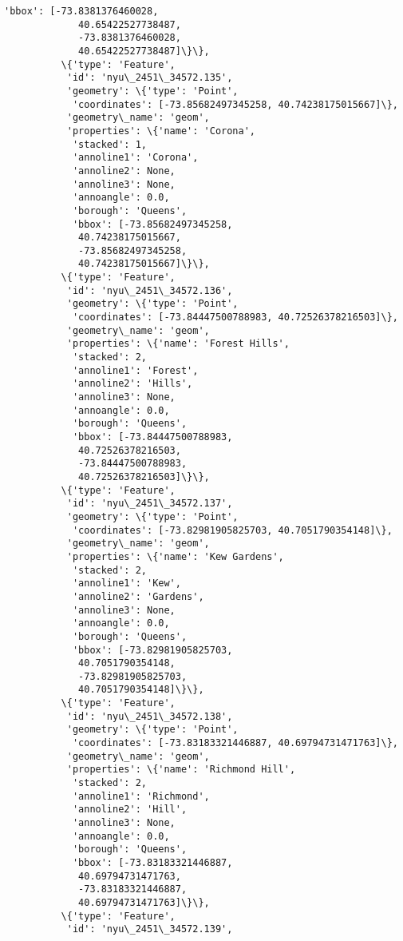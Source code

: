 \documentclass[11pt]{article}
\begin{document}
\begin{Verbatim}[commandchars=\\\{\}]
            'bbox': [-73.8381376460028,
             40.65422527738487,
             -73.8381376460028,
             40.65422527738487]\}\},
          \{'type': 'Feature',
           'id': 'nyu\_2451\_34572.135',
           'geometry': \{'type': 'Point',
            'coordinates': [-73.85682497345258, 40.74238175015667]\},
           'geometry\_name': 'geom',
           'properties': \{'name': 'Corona',
            'stacked': 1,
            'annoline1': 'Corona',
            'annoline2': None,
            'annoline3': None,
            'annoangle': 0.0,
            'borough': 'Queens',
            'bbox': [-73.85682497345258,
             40.74238175015667,
             -73.85682497345258,
             40.74238175015667]\}\},
          \{'type': 'Feature',
           'id': 'nyu\_2451\_34572.136',
           'geometry': \{'type': 'Point',
            'coordinates': [-73.84447500788983, 40.72526378216503]\},
           'geometry\_name': 'geom',
           'properties': \{'name': 'Forest Hills',
            'stacked': 2,
            'annoline1': 'Forest',
            'annoline2': 'Hills',
            'annoline3': None,
            'annoangle': 0.0,
            'borough': 'Queens',
            'bbox': [-73.84447500788983,
             40.72526378216503,
             -73.84447500788983,
             40.72526378216503]\}\},
          \{'type': 'Feature',
           'id': 'nyu\_2451\_34572.137',
           'geometry': \{'type': 'Point',
            'coordinates': [-73.82981905825703, 40.7051790354148]\},
           'geometry\_name': 'geom',
           'properties': \{'name': 'Kew Gardens',
            'stacked': 2,
            'annoline1': 'Kew',
            'annoline2': 'Gardens',
            'annoline3': None,
            'annoangle': 0.0,
            'borough': 'Queens',
            'bbox': [-73.82981905825703,
             40.7051790354148,
             -73.82981905825703,
             40.7051790354148]\}\},
          \{'type': 'Feature',
           'id': 'nyu\_2451\_34572.138',
           'geometry': \{'type': 'Point',
            'coordinates': [-73.83183321446887, 40.69794731471763]\},
           'geometry\_name': 'geom',
           'properties': \{'name': 'Richmond Hill',
            'stacked': 2,
            'annoline1': 'Richmond',
            'annoline2': 'Hill',
            'annoline3': None,
            'annoangle': 0.0,
            'borough': 'Queens',
            'bbox': [-73.83183321446887,
             40.69794731471763,
             -73.83183321446887,
             40.69794731471763]\}\},
          \{'type': 'Feature',
           'id': 'nyu\_2451\_34572.139',

\end{Verbatim}
\end{document}
